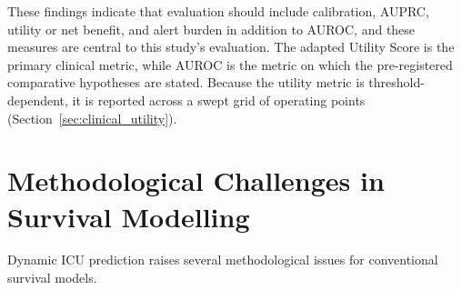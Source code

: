 These findings indicate that evaluation should include calibration, AUPRC,
utility or net benefit, and alert burden in addition to AUROC, and these
measures are central to this study's evaluation. The adapted Utility Score is
the primary clinical metric, while AUROC is the metric on which the
pre-registered comparative hypotheses are stated. Because the utility metric
is threshold-dependent, it is reported across a swept grid of operating points
(Section~\ref{sec:clinical_utility}).


\section{Methodological Challenges in Survival Modelling}
\label{sec:survival_dispute}

Dynamic ICU prediction raises several methodological issues for conventional
survival models.

